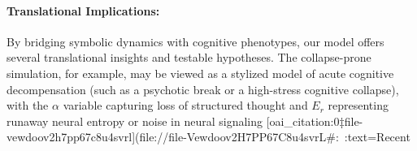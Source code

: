\paragraph{Translational Implications:} By bridging symbolic dynamics with cognitive phenotypes, our model offers several translational insights and testable hypotheses. The collapse-prone simulation, for example, may be viewed as a stylized model of acute cognitive decompensation (such as a psychotic break or a high-stress cognitive collapse), with the $\alpha$ variable capturing loss of structured thought and $E_r$ representing runaway neural entropy or noise in neural signaling [oai_citation:0‡file-vewdoov2h7pp67c8u4svrl](file://file-Vewdoov2H7PP67C8u4svrL#:~:text=Recent%